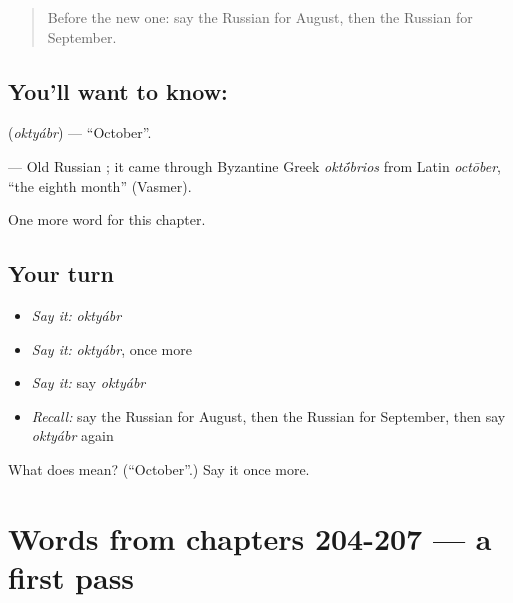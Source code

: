 \label{lesson:RU-C212-oktyabr}



\begin{quote}
Before the new one: say the Russian for August, then the Russian for September.
\end{quote}

\subsection*{You'll want to know: }
\textbf{} (\emph{oktyábr}) — \textquotedblleft{}October\textquotedblright{}.

\begin{cousinweb}
\textbf{} — Old Russian \emph{}; it came through Byzantine Greek \emph{okt\'{\={o}}brios} from Latin \emph{octōber}, \textquotedblleft{}the eighth month\textquotedblright{} (Vasmer).
\end{cousinweb}

\begin{grammarlens}[title={What you've built}]
One more word for this chapter.
\end{grammarlens}

\subsection*{Your turn}
\begin{itemize}
\raggedright
  \item \emph{Say it:} \emph{oktyábr}
  \item \emph{Say it:} \emph{oktyábr}, once more
  \item \emph{Say it:} say \emph{oktyábr}
  \item \emph{Recall:} say the Russian for August, then the Russian for September, then say \emph{oktyábr} again
\end{itemize}

\begin{tcolorbox}[breakable,colback=teal!4,colframe=teal!35!black,title={Before you move on}]
What does  mean? (\textquotedblleft{}October\textquotedblright{}.) Say it once more.
\end{tcolorbox}
\section[(dialogue)]{Words from chapters 204-207 — a first pass}

\label{lesson:RU-R212-first-pass-words-from-chapters-204-207}



